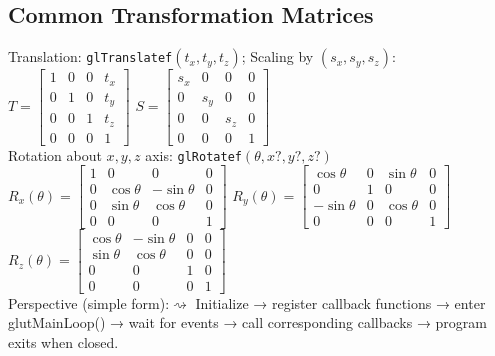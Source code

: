 \documentclass[10pt,twocolumn]{extarticle}
\begin{document}
\subsection*{Common Transformation Matrices}
Translation: \texttt{glTranslatef$(t_x,t_y,t_z)$}; Scaling by $(s_x,s_y,s_z)$:\\
  $
  T = \begin{bmatrix}
  1 & 0 & 0 & t_x \\
  0 & 1 & 0 & t_y \\
  0 & 0 & 1 & t_z \\
  0 & 0 & 0 & 1
  \end{bmatrix}
  $
  $
  S = \begin{bmatrix}
  s_x & 0 & 0 & 0 \\
  0 & s_y & 0 & 0 \\
  0 & 0 & s_z & 0 \\
  0 & 0 & 0 & 1
  \end{bmatrix}
  $\\
Rotation about $x, y, z$ axis: \texttt{glRotatef$(\theta, x?, y?, z?)$}\\
$
R_x(\theta) =
\begin{bmatrix}
1 & 0 & 0 & 0 \\
0 & \cos\theta & -\sin\theta & 0 \\
0 & \sin\theta & \cos\theta & 0 \\
0 & 0 & 0 & 1
\end{bmatrix}
$
$
R_y(\theta) =
\begin{bmatrix}
\cos\theta & 0 & \sin\theta & 0 \\
0 & 1 & 0 & 0 \\
-\sin\theta & 0 & \cos\theta & 0 \\
0 & 0 & 0 & 1
\end{bmatrix}
$\\
$
R_z(\theta) =
\begin{bmatrix}
\cos\theta & -\sin\theta & 0 & 0 \\
\sin\theta & \cos\theta & 0 & 0 \\
0 & 0 & 1 & 0 \\
0 & 0 & 0 & 1
\end{bmatrix}
$\\
Perspective (simple form):$\rightsquigarrow$
Initialize → register callback functions → enter glutMainLoop() → wait for events → call corresponding callbacks → program exits when closed.
\end{document}
